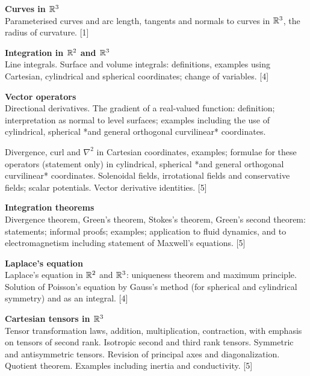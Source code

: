 \documentclass[a4paper]{article}
\begin{document}
\maketitle
{\small
  \noindent\textbf{Curves in $\mathbb{R}^3$}\\
  Parameterised curves and arc length, tangents and normals to curves in $\mathbb{R}^3$, the radius of curvature.\hspace*{\fill} [1]

  \vspace{10pt}
  \noindent\textbf{Integration in $\mathbb{R}^2$ and $\mathbb{R}^3$}\\
  Line integrals. Surface and volume integrals: definitions, examples using Cartesian, cylindrical and spherical coordinates; change of variables.\hspace*{\fill} [4]

  \vspace{10pt}
  \noindent\textbf{Vector operators}\\
  Directional derivatives. The gradient of a real-valued function: definition; interpretation as normal to level surfaces; examples including the use of cylindrical, spherical *and general orthogonal curvilinear* coordinates.

  \vspace{5pt}
  \noindent Divergence, curl and $\nabla^2$ in Cartesian coordinates, examples; formulae for these operators (statement only) in cylindrical, spherical *and general orthogonal curvilinear* coordinates. Solenoidal fields, irrotational fields and conservative fields; scalar potentials. Vector derivative identities.\hspace*{\fill} [5]

  \vspace{10pt}
  \noindent\textbf{Integration theorems}\\
  Divergence theorem, Green's theorem, Stokes's theorem, Green's second theorem: statements; informal proofs; examples; application to fluid dynamics, and to electromagnetism including statement of Maxwell's equations.\hspace*{\fill} [5]

  \vspace{10pt}
  \noindent\textbf{Laplace's equation}\\
  Laplace's equation in $\mathbb{R}^2$ and $\mathbb{R}^3$: uniqueness theorem and maximum principle. Solution of Poisson's equation by Gauss's method (for spherical and cylindrical symmetry) and as an integral.\hspace*{\fill} [4]

  \vspace{10pt}
  \noindent\textbf{Cartesian tensors in $\mathbb{R}^3$}\\
  Tensor transformation laws, addition, multiplication, contraction, with emphasis on tensors of second rank. Isotropic second and third rank tensors. Symmetric and antisymmetric tensors. Revision of principal axes and diagonalization. Quotient theorem. Examples including inertia and conductivity.\hspace*{\fill} [5]}
\end{document}
